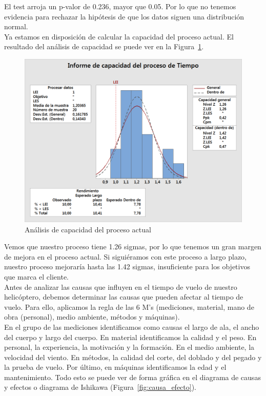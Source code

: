 \documentclass[12pt,a4paper,twoside,openright,titlepage,final]{article}
\begin{document}
El test arroja un p-valor de 0.236, mayor que 0.05. Por lo que no tenemos evidencia para rechazar la hipótesis de que los datos siguen una distribución normal.\\

Ya estamos en disposición de calcular la capacidad del proceso actual. El resultado del análisis de capacidad se puede ver en la Figura~\ref{fig:capacidad_actual}.\\ 

\begin{figure}[htbp!]
	\centering
	\includegraphics[width=0.7\linewidth]{imagenes/Informe_de_capacidad_del_proceso_de_Tiempo}
	\caption{Análisis de capacidad del proceso actual}
	\label{fig:capacidad_actual}
\end{figure}

Vemos que nuestro proceso tiene 1.26 sigmas, por lo que tenemos un gran margen de mejora en el proceso actual. Si siguiéramos con este proceso a largo plazo, nuestro proceso mejoraría hasta las 1.42 sigmas, insuficiente para los objetivos que marca el cliente.\\

Antes de analizar las causas que influyen en el tiempo de vuelo de nuestro helicóptero, debemos determinar las causas que pueden afectar al tiempo de vuelo. Para ello, aplicamos la regla de las 6 M's (mediciones, material, mano de obra (personal), medio ambiente, métodos y máquinas).\\

En el grupo de las mediciones identificamos como causas el largo de ala, el ancho del cuerpo y largo del cuerpo. En material identificamos la calidad y el peso. En personal, la experiencia, la motivación y la formación. En el medio ambiente, la velocidad del viento. En métodos, la calidad del corte, del doblado y del pegado y la prueba de vuelo. Por último, en máquinas identificamos la edad y el mantenimiento. Todo esto se puede ver de forma gráfica en el diagrama de causas y efectos o diagrama de Ishikawa (Figura~\ref{fig:causa_efecto}).\\
\end{document}
